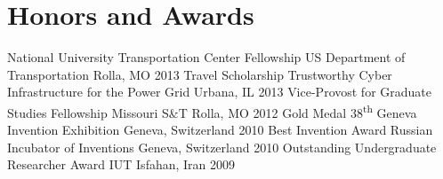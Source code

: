 \section{Honors and Awards}
\begin{cvhonors}
  \cvhonor
    {National University Transportation Center Fellowship}
    {US Department of Transportation}
    {Rolla, MO}
    {2013}
  \cvhonor
    {Travel Scholarship}
    {Trustworthy Cyber Infrastructure for the Power Grid}
    {Urbana, IL}
    {2013}
  \cvhonor
    {Vice-Provost for Graduate Studies Fellowship}
    {Missouri S\&T}
    {Rolla, MO}
    {2012}
  \cvhonor
    {Gold Medal}
    {38\textsuperscript{th} Geneva Invention Exhibition}
    {Geneva, Switzerland}
    {2010}
  \cvhonor
    {Best Invention Award}
    {Russian Incubator of Inventions}
    {Geneva, Switzerland}
    {2010}
  \cvhonor
    {Outstanding Undergraduate Researcher Award}
    {IUT}
    {Isfahan, Iran}
    {2009}
\end{cvhonors} 